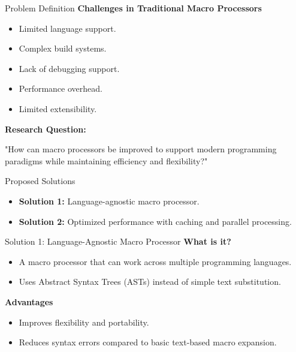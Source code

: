 \documentclass{beamer}
\begin{document}
\begin{frame}{Problem Definition}
    \textbf{Challenges in Traditional Macro Processors}
    \begin{itemize}
        \item Limited language support.
        \item Complex build systems.
        \item Lack of debugging support.
        \item Performance overhead.
        \item Limited extensibility.
    \end{itemize}
    \textbf{Research Question:}
    \begin{block}{}
        "How can macro processors be improved to support modern programming paradigms while maintaining efficiency and flexibility?"
    \end{block}
\end{frame}

\begin{frame}{Proposed Solutions}
    \begin{itemize}
        \item \textbf{Solution 1:} Language-agnostic macro processor.
        \item \textbf{Solution 2:} Optimized performance with caching and parallel processing.
    \end{itemize}
\end{frame}

\begin{frame}{Solution 1: Language-Agnostic Macro Processor}
    \textbf{What is it?}
    \begin{itemize}
        \item A macro processor that can work across multiple programming languages.
        \item Uses Abstract Syntax Trees (ASTs) instead of simple text substitution.
    \end{itemize}
    \textbf{Advantages}
    \begin{itemize}
        \item Improves flexibility and portability.
        \item Reduces syntax errors compared to basic text-based macro expansion.
    \end{itemize}
\end{frame}
\end{document}
